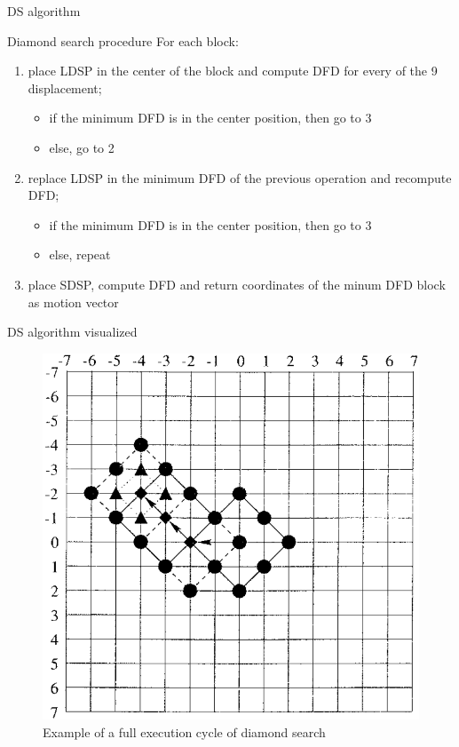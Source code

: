 \documentclass[aspectratio=1610,xcolor=dvipsnames]{beamer}
\begin{document}
\begin{frame}{DS algorithm}
    \begin{block}{Diamond search procedure}
        For each block:
        \begin{enumerate}
            \item place LDSP in the center of the block and compute DFD for every of the 9 displacement;
            \begin{itemize}
                \item if the minimum DFD is in the center position, then go to 3
                \item else, go to 2
            \end{itemize}
            \item replace LDSP in the minimum DFD of the previous operation and recompute DFD;
            \begin{itemize}
                \item if the minimum DFD is in the center position, then go to 3
                \item else, repeat 
            \end{itemize}
            \item place SDSP, compute DFD and return coordinates of the minum DFD block as motion vector
        \end{enumerate}
    \end{block}
\end{frame}

\begin{frame}{DS algorithm visualized}
    \begin{figure}
        \centering
        \includegraphics[keepaspectratio,width=.45\linewidth]{images/ds-exe.png}
        \caption{Example of a full execution cycle of diamond search}
    \end{figure}    
\end{frame}
\end{document}
